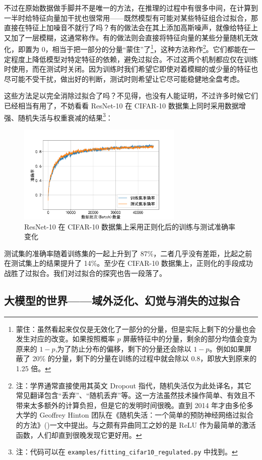 不过在原始数据做手脚并不是唯一的方法，在推理的过程中有很多中间，在计算到一半时给特征向量加干扰也很常用——既然模型有可能对某些特征组合过拟合，那直接在特征上加噪音不就行了吗？有的做法会在其上添加高斯噪声，就像给特征上又加了一层模糊，这通常称作。有的做法则会直接将特征向量的某些分量随机无效化，即置为 0，相当于把一部分的分量“蒙住”了\footnote{蒙住：虽然看起来仅仅是无效化了一部分的分量，但是实际上剩下的分量也会发生对应的改变。如果按照概率 $p$ 屏蔽特征中的分量，剩余的部分均值会变为原来的 $1-p$,为了防止分布的偏移，剩下的分量还会除以 $1-p$。例如如果屏蔽了 20\% 的分量，剩下的分量在训练的过程中就会除以 0.8，即放大到原来的 1.25 倍。}，这种方法称作\footnote{注：学界通常直接使用其英文 Dropout 指代，随机失活仅为此处译名，其它常见翻译包含“丢弃”、“随机丢弃”等。这一方法虽然技术操作简单、有效且不带来太多额外的计算负担，但是它的发明时间很晚。直到 2014 年才由多伦多大学的 Geoffrey Hinton 团队在《随机失活：一个简单的预防神经网络过拟合的方法》()一文中提出。与之颇有异曲同工之妙的是 ReLU 作为最简单的激活函数，人们却直到很晚发现它更好用。}。它们都能在一定程度上降低模型对特定特征的依赖，避免过拟合。不过这两个机制都应仅在训练时使用，而在测试时关闭。因为训练时我们希望它即使对着模糊的或少量的特征也尽可能不受干扰，做出好的判断，测试时则希望让它尽可能稳健地全盘考虑。

这些方法足以完全消除过拟合了吗？不见得，也没有人能证明，不过许多时候它们已经相当有用了，不妨看看 ResNet-10 在 CIFAR-10 数据集上同时采用数据增强、随机失活与权重衰减的结果\footnote{注：代码可以在 \texttt{examples/fitting\_cifar10\_regulated.py} 中找到。}：
\begin{figure}[H]
    \centering
    \includegraphics[width=0.7\textwidth]{img/resnet10_cifar10_regulated.png}
    \caption{ResNet-10 在 CIFAR-10 数据集上采用正则化后的训练与测试准确率变化}
    \label{fig:resnet10-cifar10-regulated-accuracy}
\end{figure}

测试集的准确率随着训练集的一起上升到了 87\%，二者几乎没有差距，比起之前在测试集上的结果提升了 14\%。至少在 CIFAR-10 数据集上，正则化的手段成功战胜了过拟合。我们对过拟合的探究也告一段落了。

\newpage

\subsection{大模型的世界——域外泛化、幻觉与消失的过拟合}